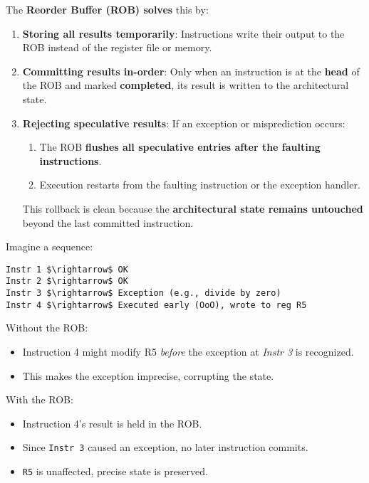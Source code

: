 \highspace
The \textbf{Reorder Buffer (ROB) solves} this by:
\begin{enumerate}[label=\textcolor{Green3}{\faIcon{check}}]
    \item \textcolor{Green3}{\textbf{Storing all results temporarily}}: Instructions write their output to the ROB instead of the register file or memory.
    \item \textcolor{Green3}{\textbf{Committing results in-order}}: Only when an instruction is at the \textbf{head} of the ROB and marked \textbf{completed}, its result is written to the architectural state.
    \item \textcolor{Green3}{\textbf{Rejecting speculative results}}: If an exception or misprediction occurs:
    \begin{enumerate}
        \item The ROB \textbf{flushes all speculative entries after the faulting instructions}.
        \item Execution restarts from the faulting instruction or the exception handler.
    \end{enumerate}
    This rollback is clean because the \textbf{architectural state remains untouched} beyond the last committed instruction.
\end{enumerate}

\newpage

\begin{examplebox}
    Imagine a sequence:
    \begin{lstlisting}[mathescape=true]
Instr 1 $\rightarrow$ OK
Instr 2 $\rightarrow$ OK
Instr 3 $\rightarrow$ Exception (e.g., divide by zero)
Instr 4 $\rightarrow$ Executed early (OoO), wrote to reg R5\end{lstlisting}
    \textcolor{Red2}{} Without the ROB:
    \begin{itemize}
        \item Instruction 4 might modify R5 \emph{before} the exception at \textsl{Instr 3} is recognized.
        \item This makes the exception imprecise, corrupting the state.
    \end{itemize}
    \textcolor{Green3}{} With the ROB:
    \begin{itemize}
        \item Instruction 4's result is held in the ROB.
        \item Since \texttt{Instr 3} caused an exception, no later instruction commits.
        \item \texttt{R5} is unaffected, precise state is preserved.
    \end{itemize}
\end{examplebox}

